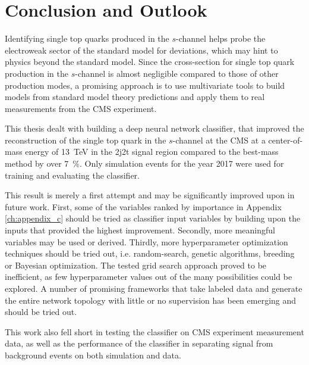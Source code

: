 \chapter{Conclusion and Outlook}
Identifying single top quarks produced in the $s$-channel helps probe the electroweak sector of the standard model for deviations, which may hint to physics beyond the standard model. Since the cross-section for single top quark production in the $s$-channel is almost negligible compared to those of other production modes, a promising approach is to use multivariate tools to build models from standard model theory predictions and apply them to real measurements from the CMS experiment.

This thesis dealt with building a deep neural network classifier, that improved the reconstruction of the single top quark in the $s$-channel at the CMS at a center-of-mass energy of \SI{13}{TeV} in the 2j2t signal region compared to the best-mass method by over \SI{7}{\%}. Only simulation events for the year 2017 were used for training and evaluating the classifier.

This result is merely a first attempt and may be significantly improved upon in future work. First, some of the variables ranked by importance in Appendix \ref{ch:appendix_c} should be tried as classifier input variables by building upon the inputs that provided the highest improvement. Secondly, more meaningful variables may be used or derived. Thirdly, more hyperparameter optimization techniques should be tried out, i.e. random-search, genetic algorithms, breeding or Bayesian optimization. The tested grid search approach proved to be inefficient, as few hyperparameter values out of the many possibilities could be explored. A number of promising frameworks that take labeled data and generate the entire network topology with little or no supervision has been emerging and should be tried out.

This work also fell short in testing the classifier on CMS experiment measurement data, as well as the performance of the classifier in separating signal from background events on both simulation and data.